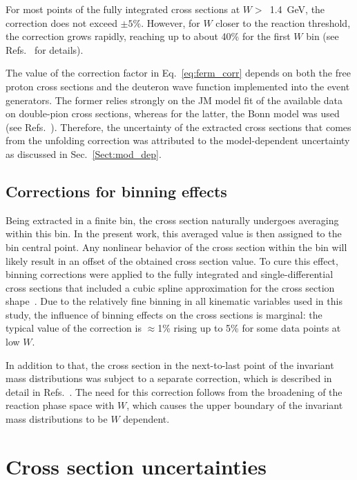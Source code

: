\documentclass[prc,twocolumn,superscriptaddress,showpacs,amssymb,amsmath,amsfonts,aps,nofootinbib]{revtex4-1}
\begin{document}
For most points of the fully integrated cross sections at $W>$~1.4~GeV, the correction does not exceed $\pm 5$\%. However, for $W$ closer to the reaction threshold, the correction grows rapidly, reaching up to about 40\% for the first $W$ bin (see Refs.\!~\cite{my_an_note:2020, my_thesis:2021} for details).


The value of the correction factor in Eq.\!~\eqref{eq:ferm_corr} depends on both the free proton cross sections and the deuteron wave function implemented into the event generators. The former relies strongly on the JM model fit of the available data on double-pion cross sections, whereas for the latter, the Bonn model was used (see Refs.\!~\cite{twopeg,twopeg-d}). Therefore, the uncertainty of the extracted cross sections that comes from the unfolding correction was attributed to the model-dependent uncertainty as discussed in Sec.\!~\ref{Sect:mod_dep}. 


\subsection{Corrections for binning effects}
\label{Sect:bin_cor}

Being extracted in a finite bin, the cross section naturally undergoes averaging within this bin. In the present work, this averaged value is then assigned to the bin central point. Any nonlinear behavior of the cross section within the bin will likely result in an offset of the obtained cross section value. To cure this effect, binning corrections were applied to the fully integrated and single-differential cross sections that included a cubic spline approximation for the cross section shape~\cite{my_an_note:2020, my_thesis:2021}. Due to the relatively fine binning in all kinematic variables used in this study, the influence of binning effects on the cross sections is marginal: the typical value of the correction is $\approx$1\% rising up to 5\% for some data points at low $W$.

In addition to that, the cross section in the next-to-last point of the invariant mass distributions was subject to a separate correction, which is described in detail in Refs.\!~\cite{Fed_an_note:2017,Fed_paper_2018,my_an_note:2020, my_thesis:2021}. The need for this correction follows from the broadening of the reaction phase space with $W$, which causes the upper boundary of the invariant mass distributions to be $W$ dependent.


\section{Cross section uncertainties}
\label{Sect:uncert}
\end{document}

